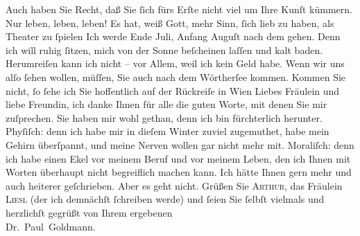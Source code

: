 \begin{ledgroupsized}[t]{13cm}
           \pstart
           Auch haben Sie Recht, daß Sie ſich fürs Erſte nicht viel um Ihre Kunſt kümmern. Nur
               leben, leben, leben! Es hat, weiß Gott, mehr Sinn, ſich lieb zu haben, als Theater zu
                  ſpielen{\dotsfive}\pend
           \pstart
           Ich werde Ende Juli, Anfang Auguſt nach dem \label{K_L03528-1v}\label{K_L03528-1h}{ }{\pb}gehen. Denn ich will ruhig ſitzen, mich von der
               Sonne beſcheinen laſſen und kalt baden. Herumreiſen kann ich nicht – vor Allem, weil
               ich kein Geld habe. Wenn wir uns alſo ſehen wollen, müſſen, Sie auch nach dem Wörtherſee kommen. Kommen Sie nicht, ſo ſehe ich
               Sie hoffentlich auf der Rückreiſe in Wien\pend
           \pstart
           Liebes Fräulein und liebe Freundin, ich danke Ihnen für alle die guten Worte, mit
               denen Sie mir zuſprechen. Sie haben mir wohl gethan, denn ich bin fürchterlich
               herunter. {\pb}Phyſiſch: denn ich habe mir in dieſem
               Winter zuviel zugemuthet, habe mein Gehirn überſpannt, und meine Nerven wollen gar
               nicht mehr mit. Moraliſch: denn ich habe einen Ekel vor meinem Beruf und vor meinem
               Leben, den ich Ihnen mit Worten überhaupt nicht begreiflich machen kann. Ich hätte
               Ihnen gern mehr und auch heiterer geſchrieben. Aber es geht nicht. Grüßen Sie \textsc{Arthur}, das Fräulein \textsc{Liesl} (der ich demnächſt ſchreiben werde) und ſeien Sie ſelbſt vielmals und
               herzlichſt gegrüßt von Ihrem ergebenen {\\}\spacefill\mbox{Dr. Paul Goldmann.}\pend
           
         
         \endnumbering{}\end{ledgroupsized}\begin{anhang}\end{anhang}\newcommand{\dateiname}{L03528}\newcommand{\titel}{Paul Goldmann an Olga Gussmann, 28. 5. [1901]}\newcommand{\editorInnen}{Martin Anton Müller und Laura Untner}
      